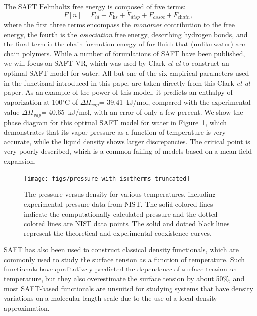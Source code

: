 \documentclass[letterpaper,twocolumn,amsmath,amssymb,prb]{revtex4-1}
\begin{document}
The SAFT Helmholtz free energy is composed of five terms:
\begin{equation} \label{eq:SAFT-free-energy}
  F[n] = F_\textit{id} + F_\textit{hs} + F_\textit{disp} +
  F_\textit{assoc} + F_\textit{chain},
\end{equation}
where the first three terms encompass the \emph{monomer} contribution
to the free energy, the fourth is the \emph{association} free energy,
describing hydrogen bonds, and the final term is the chain formation
energy of for fluids that (unlike water) are chain polymers.  While a
number of forumlations of SAFT have been published, we will focus on
SAFT-VR\cite{gil-villegas-1997-SAFT-VR}, which was used by Clark
\emph{et al} to construct an optimal SAFT model for
water\cite{clark2006developing}. All but one of the six empirical
parameters used in the functional introduced in this paper are taken
directly from this Clark \emph{et al} paper.  As an example of the
power of this model, it predicts an enthalpy of vaporization at
100$^\circ$C of $\Delta H_{vap}$= 39.41~kJ/mol, compared with the
experimental value $\Delta H_{vap}$= 40.65~kJ/mol\cite{nistwater},
with an error of only a few percent.  We show the phase diagram for
this optimal SAFT model for water in
Figure~\ref{fig:pressure-with-isotherms}, which demonstrates that its
vapor pressure as a function of temperature is very accurate, while
the liquid density shows larger discrepancies.  The critical point is
very poorly described, which is a common failing of models based on a
mean-field expansion.

\begin{figure}
\begin{center}
\texttt{[image: figs/pressure-with-isotherms-truncated]}
\end{center}
\caption{The pressure versus density for various temperatures, including
experimental pressure data from NIST\cite{nistwater}. The solid colored lines
indicate the computationally calculated pressure and the dotted
colored lines are NIST data points. The solid and dotted black lines
represent the theoretical and experimental coexistence curves.}
\label{fig:pressure-with-isotherms}
\end{figure}

SAFT has also been used to construct classical density functionals,
which are commonly used to study the surface tension as a function of
temperature\cite{clark2006developing, gloor2004accurate,
  gloor2007prediction, blas2001examination, gloor2002saft}.  Such
functionals have qualitatively predicted the dependence of surface
tension on temperature, but they also overestimate
the surface tension by about 50\%, and most SAFT-based functionals are
unsuited for studying systems that have density variations on a
molecular length scale due to the use of a local density
approximation\cite{gloor2002saft,clark2006developing, gloor2007prediction,
gloor2004accurate, gross2009density, kahl2008modified, blas2001examination}.
\end{document}
